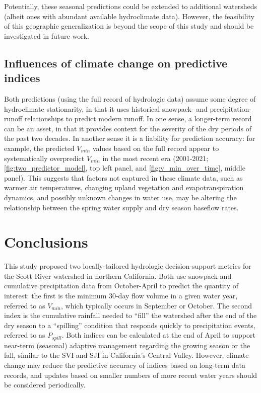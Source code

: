 \documentclass[hess, manuscript]{copernicus}
\begin{document}
Potentially, these seasonal predictions could be extended to additional
watersheds (albeit ones with abundant available hydroclimate data).
However, the feasibility of this geographic generalization is beyond the
scope of this study and should be investigated in future work.

\subsection{Influences of climate change on predictive indices}

Both predictions (using the full record of hydrologic data) assume some
degree of hydroclimate stationarity, in that it uses historical
snowpack- and precipitation-runoff relationships to predict modern
runoff. In one sense, a longer-term record can be an asset, in that it
provides context for the severity of the dry periods of the past two
decades. In another sense it is a liability for prediction accuracy: for
example, the predicted \(V_{min}\) values based on the full record
appear to systematically overpredict \(V_{min}\) in the most recent era
(2001-2021; \autoref{fig:two_predictor_model}, top left panel, and
\autoref{fig:v_min_over_time}, middle panel). This suggests that factors
not captured in these climate data, such as warmer air temperatures,
changing upland vegetation and evapotranspiration dynamics, and possibly
unknown changes in water use, may be altering the relationship between
the spring water supply and dry season baseflow rates.

\section{Conclusions}

This study proposed two locally-tailored hydrologic decision-support
metrics for the Scott River watershed in northern California. Both use
snowpack and cumulative precipitation data from October-April to predict
the quantity of interest: the first is the minimum 30-day flow volume in
a given water year, referred to as \(V_{min}\), which typically occurs
in September or October. The second index is the cumulative rainfall
needed to ``fill'' the watershed after the end of the dry season to a
``spilling'' condition that responds quickly to precipitation events,
referred to as \(P_{spill}\). Both indices can be calculated at the end
of April to support near-term (seasonal) adaptive management regarding
the growing season or the fall, similar to the SVI and SJI in
California's Central Valley. However, climate change may reduce the
predictive accuracy of indices based on long-term data records, and
updates based on smaller numbers of more recent water years should be
considered periodically.
\end{document}
